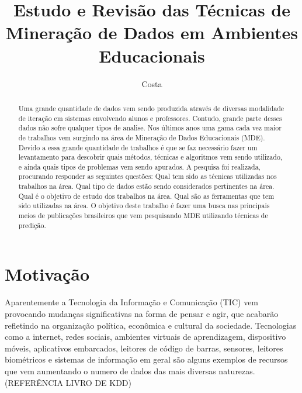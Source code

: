 \documentclass[diss-proposta,nocipinfo]{texufpel}
\title{Estudo e Revisão das Técnicas de Mineração de Dados em Ambientes Educacionais}
\author{Costa}{Alexandre Gomes da}
\begin{document}
\maketitle 
\sloppy

\begin{abstract}
Uma grande quantidade de dados vem sendo produzida através de diversas modalidade de iteração em sistemas envolvendo alunos e professores. Contudo, grande parte desses dados não sofre qualquer tipos de analise. Nos últimos anos uma gama cada vez maior de trabalhos vem surgindo na área de Mineração de Dados Educacionais (MDE). Devido a essa grande quantidade de trabalhos é que se faz necessário fazer um levantamento para descobrir quais métodos, técnicas e algoritmos vem sendo utilizado, e ainda quais tipos de problemas vem sendo apurados. A pesquisa foi realizada, procurando responder as seguintes questões: Qual tem sido as técnicas utilizadas nos trabalhos na área. Qual tipo de dados estão sendo considerados pertinentes na área. Qual é o objetivo de estudo dos trabalhos na área. Qual são as ferramentas que tem sido utilizadas na área. O objetivo deste trabalho é fazer uma busca nas principais meios de publicações brasileiros que vem pesquisando MDE utilizando técnicas de predição.
\end{abstract}

\chapter{Motivação}

Aparentemente a Tecnologia da Informação e Comunicação (TIC) vem provocando mudanças significativas na forma de pensar e agir, que acabarão refletindo na organização política, econômica e cultural da sociedade.
Tecnologias como a internet, redes sociais, ambientes virtuais de aprendizagem, dispositivo móveis, aplicativos embarcados, leitores de código de barras, sensores, leitores biométricos e sistemas de informação em geral são alguns exemplos de recursos que vem aumentando o numero de dados das mais diversas naturezas. (REFERÊNCIA LIVRO DE KDD)
\end{document}
